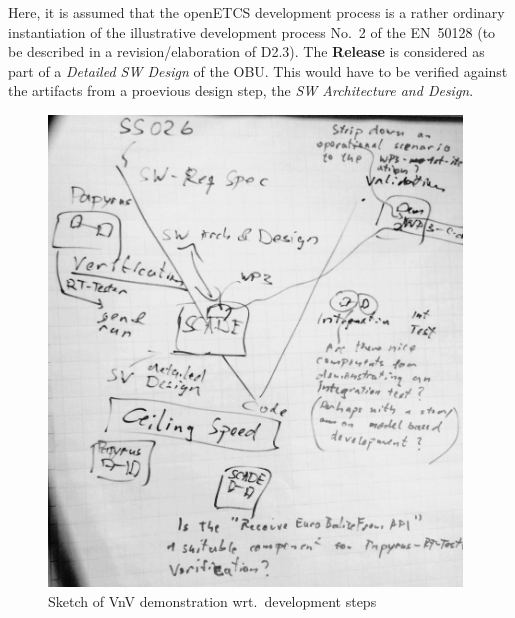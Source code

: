 \documentclass[a4paper,german]{article}
\begin{document}
Here, it is assumed that the openETCS development process is a rather
ordinary instantiation of the illustrative development process No.~2
of the EN~50128 (to be described in a revision/elaboration of
D2.3). The \textbf{Release} is considered as part of a
\textit{Detailed SW Design} of the OBU. This would have to be verified
against the artifacts from a proevious design step, the \textit{SW
  Architecture and Design}.

\begin{figure}[hbt]
  \centering
  \includegraphics[height=125mm]{Sketch-C-crop-bw.jpg}
  \caption{Sketch of VnV demonstration wrt.\ development steps}
  \label{fig:sktchVnV}
\end{figure}
\end{document}
